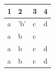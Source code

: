 \documentclass[11pt,a4paper]{article}
\begin{document}
\begin{table}[h]
\begin{tabular}{|l|l|l|l|}
\hline
1 & 2 & 3 & 4 \\ \hline
a & 'b' & c & d \\ \hline
a & b & c &  \\ \hline
a & b & c & d \\ \hline
a & b & c & d \\ \hline
\end{tabular}
\end{table}
\end{document}
